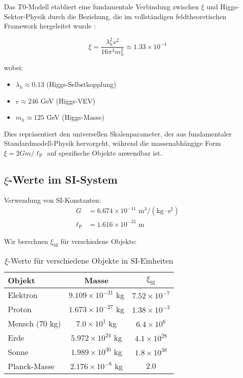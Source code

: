 \documentclass[12pt,a4paper]{article}
\newcommand{\xipar}{\xi}
\newcommand{\lP}{\ell_{\text{P}}}
\newcommand{\lambdah}{\lambda_h}
\newcommand{\pichar}{\pi}
\begin{document}
	Das T0-Modell etabliert eine fundamentale Verbindung zwischen $\xipar$ und Higgs-Sektor-Physik durch die Beziehung, die im vollständigen feldtheoretischen Framework hergeleitet wurde \cite{pascher_derivation_beta_2025}:
	
	\begin{equation}
		\xipar = \frac{\lambdah^2 v^2}{16\pichar^3 m_h^2} \approx 1.33 \times 10^{-4}
		\label{eq:xi_higgs_fundamental}
	\end{equation}
	
	wobei:
	\begin{itemize}
		\item $\lambdah \approx 0.13$ (Higgs-Selbstkopplung)
		\item $v \approx 246$ GeV (Higgs-VEV)
		\item $m_h \approx 125$ GeV (Higgs-Masse)
	\end{itemize}
	
	Dies repräsentiert den universellen Skalenparameter, der aus fundamentaler Standardmodell-Physik hervorgeht, während die massenabhängige Form $\xipar = 2Gm/\lP$ auf spezifische Objekte anwendbar ist.
	
	\subsection{$\xipar$-Werte im SI-System}
	\label{subsec:xi_si_werte}
	
	Verwendung von SI-Konstanten:
	\begin{align}
		G &= 6.674 \times 10^{-11} \text{ m}^3/(\text{kg} \cdot \text{s}^2) \\
		\lP &= 1.616 \times 10^{-35} \text{ m}
	\end{align}
	
	Wir berechnen $\xipar_{\text{SI}}$ für verschiedene Objekte:
	
	\begin{table}[htbp]
		\centering
		\begin{tabular}{lcc}
			\toprule
			\textbf{Objekt} & \textbf{Masse} & \textbf{$\xipar_{\text{SI}}$} \\
			\midrule
			Elektron & $9.109 \times 10^{-31}$ kg & $7.52 \times 10^{-7}$ \\
			Proton & $1.673 \times 10^{-27}$ kg & $1.38 \times 10^{-3}$ \\
			Mensch (70 kg) & $7.0 \times 10^{1}$ kg & $6.4 \times 10^{6}$ \\
			Erde & $5.972 \times 10^{24}$ kg & $4.1 \times 10^{28}$ \\
			Sonne & $1.989 \times 10^{30}$ kg & $1.8 \times 10^{38}$ \\
			Planck-Masse & $2.176 \times 10^{-8}$ kg & $2.0$ \\
			\bottomrule
		\end{tabular}
		\caption{$\xipar$-Werte für verschiedene Objekte in SI-Einheiten}
		\label{tab:xi_si_werte}
	\end{table}
	
\end{document}
